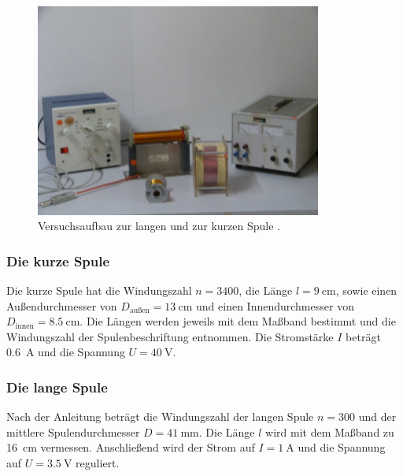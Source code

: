 \begin{figure}
    \centering
    \includegraphics[height = 7cm]{abbildungen/lange und kurze spule.png}
    \caption[]{Versuchsaufbau zur langen und zur kurzen Spule \cite[]{man:v308}.}
    \label{fig:lange_kurze_spule}
\end{figure}

\subsubsection{Die kurze Spule}
Die kurze Spule hat die Windungszahl $n = 3400$, die Länge $l = \qty[]{9}{\cm}$, sowie einen Außendurchmesser von 
$D_\text{außen} = \qty[]{13}{\cm}$ und einen Innendurchmesser von $D_\text{innen} = \qty[]{8.5}{\cm}$.
Die Längen werden jeweils mit dem Maßband bestimmt und die Windungszahl der Spulenbeschriftung entnommen.
Die Stromstärke $I$ beträgt \qty[]{0.6}{\ampere} und die Spannung $U = \qty[]{40}{\volt}$.


\subsubsection{Die lange Spule}
Nach der Anleitung \cite[]{man:v308} beträgt die Windungszahl der langen Spule $n = 300$ und der mittlere Spulendurchmesser $D = \qty[]{41}{\mm}$.
Die Länge $l$ wird mit dem Maßband zu \qty[]{16}{cm} vermessen.
Anschließend wird der Strom auf $I = \qty[]{1}{\ampere}$ und die Spannung auf $U = \qty[]{3.5}{\volt}$ reguliert.
